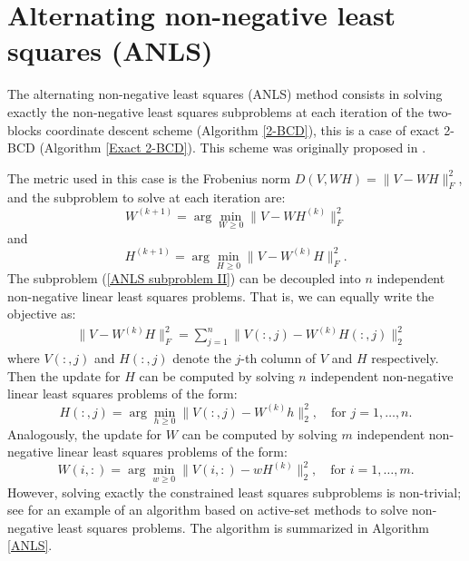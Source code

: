 \section{Alternating non-negative least squares (ANLS)}
The alternating non-negative least squares (ANLS) method consists in solving exactly the non-negative least squares subproblems at each iteration of the two-blocks coordinate descent scheme (Algorithm \ref{2-BCD}), this is a case of exact 2-BCD (Algorithm \ref{Exact 2-BCD}).
This scheme was originally proposed in \cite{paatero1994positive}.
\par
The metric used in this case is the Frobenius norm $D(V, WH) = \|V - WH\|_F^2$, and the subproblem to solve at each iteration are:
\begin{equation}\label{ANLS subproblem I}
    W^{(k + 1)} = \arg\min_{W \geq 0} \|V - WH^{(k)}\|_F^2
\end{equation}
and
\begin{equation}\label{ANLS subproblem II}
    H^{(k + 1)} = \arg\min_{H \geq 0} \|V - W^{(k)}H\|_F^2.
\end{equation}
The subproblem (\ref{ANLS subproblem II}) can be decoupled into $n$ independent non-negative linear least squares problems.
That is, we can equally write the objective as:
\begin{align}
    &\|V - W^{(k)}H\|_F^2 = \sum_{j=1}^n \|V(:,j) - W^{(k)}H(:,j)\|_2^2
\end{align}
where $V(:,j)$ and $H(:,j)$ denote the $j$-th column of $V$ and $H$ respectively.
Then the update for $H$ can be computed by solving $n$ independent non-negative linear least squares problems of the form:
\begin{equation}
    H(:,j) = \arg\min_{h \geq 0} \|V(:,j) - W^{(k)}h\|_2^2, \quad \text{for } j = 1, \ldots, n.
\end{equation}
Analogously, the update for $W$ can be computed by solving $m$ independent non-negative linear least squares problems of the form:
\begin{equation}
    W(i,:) = \arg\min_{w \geq 0} \|V(i,:) - w H^{(k)}\|_2^2, \quad \text{for } i = 1, \ldots, m.
\end{equation}
However, solving exactly the constrained least squares subproblems is non-trivial; see \cite{kim2008nonnegative} for an example of an algorithm based on active-set methods to solve non-negative least squares problems.
The algorithm is summarized in Algorithm \ref{ANLS}.
